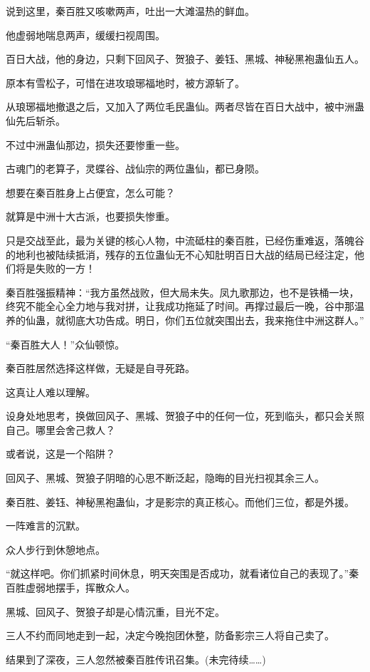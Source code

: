 \begin{this_body}
说到这里，秦百胜又咳嗽两声，吐出一大滩温热的鲜血。

他虚弱地喘息两声，缓缓扫视周围。

百日大战，他的身边，只剩下回风子、贺狼子、姜钰、黑城、神秘黑袍蛊仙五人。

原本有雪松子，可惜在进攻琅琊福地时，被方源斩了。

从琅琊福地撤退之后，又加入了两位毛民蛊仙。两者尽皆在百日大战中，被中洲蛊仙先后斩杀。

不过中洲蛊仙那边，损失还要惨重一些。

古魂门的老算子，灵蝶谷、战仙宗的两位蛊仙，都已身陨。

想要在秦百胜身上占便宜，怎么可能？

就算是中洲十大古派，也要损失惨重。

只是交战至此，最为关键的核心人物，中流砥柱的秦百胜，已经伤重难返，落魄谷的地利也被陆续抵消，残存的五位蛊仙无不心知肚明百日大战的结局已经注定，他们将是失败的一方！

秦百胜强振精神：“我方虽然战败，但大局未失。凤九歌那边，也不是铁桶一块，终究不能全心全力地与我对拼，让我成功拖延了时间。再撑过最后一晚，谷中那温养的仙蛊，就彻底大功告成。明日，你们五位就突围出去，我来拖住中洲这群人。”

“秦百胜大人！”众仙顿惊。

秦百胜居然选择这样做，无疑是自寻死路。

这真让人难以理解。

设身处地思考，换做回风子、黑城、贺狼子中的任何一位，死到临头，都只会关照自己。哪里会舍己救人？

或者说，这是一个陷阱？

回风子、黑城、贺狼子阴暗的心思不断泛起，隐晦的目光扫视其余三人。

秦百胜、姜钰、神秘黑袍蛊仙，才是影宗的真正核心。而他们三位，都是外援。

一阵难言的沉默。

众人步行到休憩地点。

“就这样吧。你们抓紧时间休息，明天突围是否成功，就看诸位自己的表现了。”秦百胜虚弱地摆手，挥散众人。

黑城、回风子、贺狼子却是心情沉重，目光不定。

三人不约而同地走到一起，决定今晚抱团休整，防备影宗三人将自己卖了。

结果到了深夜，三人忽然被秦百胜传讯召集。(未完待续……)

\end{this_body}

